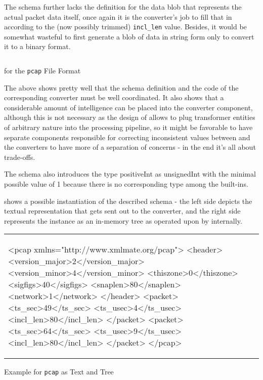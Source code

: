 The schema further lacks the definition for the data blob that represents the actual packet data itself, once
again it is the converter's job to fill that in according to the (now possibly trimmed) \texttt{incl\_len}
value. Besides, it would be somewhat wasteful to first generate a blob of data in string form only to 
convert it to a binary format.

\begin{listing}[htp]
\centering
\inputminted[frame=lines,fontsize=\small]{xml}{../subjects/pcap/schema/pcap.xsd}
\caption{\xsd for the \texttt{pcap} File Format}
\label{lst:xsdexample}
\end{listing}

The above shows pretty well that the schema definition and the code of the corresponding converter must be well
coordinated. It also shows that a considerable amount of intelligence can be placed into the converter
component, although this is not necessary as the design of \xmlmate allows to plug transformer entities
of arbitrary nature into the processing pipeline, so it might be favorable to have separate components
responsible for correcting inconsistent values between \xmlmate and the converters to have more of a separation
of concerns - in the end it's all about trade-offs.

The schema also introduces the type positiveInt as unsignedInt with the minimal possible value of 1 because
there is no corresponding type among the \xsd built-ins.

 shows a possible instantiation of the described schema - the left side depicts the
textual representation that gets sent out to the converter, and the right side represents the instance as an
in-memory \xml tree as operated upon by \xmlmate internally.


\begin{listing}[H]
\centering
\begin{tabular}{|m{4.5cm}m{8cm}|}
\begin{xmlcode}
<pcap xmlns="http://www.xmlmate.org/pcap">
	<header>
		<version_major>2</version_major>
		<version_minor>4</version_minor>
		<thiszone>0</thiszone>
		<sigfigs>40</sigfigs>
		<snaplen>80</snaplen>
		<network>1</network>
	</header>
	<packet>
		<ts_sec>49</ts_sec>
		<ts_usec>4</ts_usec>
		<incl_len>80</incl_len>
	</packet>
	<packet>
		<ts_sec>64</ts_sec>
		<ts_usec>9</ts_usec>
		<incl_len>80</incl_len>
	</packet>
</pcap>
\end{xmlcode}
&
\begin{tikzpicture}[grow=right]
\tikzset{level distance=68pt,sibling distance=0pt}
\tikzset{execute at begin node=\strut}
	\Tree [.pcap 
[.packet [.incl\_len 80 ] [.ts\_usec 9 ] [.ts\_sec 64 ] ]
[.packet [.incl\_len 80 ] [.ts\_usec 4 ] [.ts\_sec 49 ] ]
[.header [.network 1 ] [.snaplen 80 ] [.sigfigs 40 ] [.thiszone 0 ] [.version\_minor 4 ] [.version\_major 2 ] ]
]
\end{tikzpicture}
\end{tabular}
\caption{Example \xml for \texttt{pcap} as Text and Tree}
\label{lst:xmlexample}
\end{listing}

